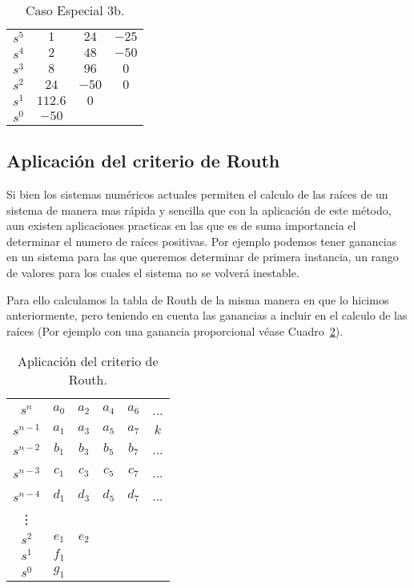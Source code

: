 \begin{enumerate}
            \begin{table}[htbp]
                \centering
                \begin{tabular}{c|c c c}
                $s^5$ & $1$ & $24$ & $-25$ \\
                $s^4$ & $2$ & $48$ & $-50$ \\
                $s^3$ & $8$ & $96$ & $0$   \\
                $s^2$ & $24$ & $-50$ & $0$ \\
                $s^1$ & $112.6$ & $0$ \\
                $s^0$ & $-50$
                \end{tabular}
                \caption{\label{tab:Caso3b}Caso Especial 3b.}
            \end{table}

        \end{enumerate}

    \subsection{Aplicación del criterio de Routh}
        Si bien los sistemas numéricos actuales permiten el calculo de las raíces de un sistema de manera mas rápida y sencilla que con la aplicación de este método, aun existen aplicaciones practicas en las que es de suma importancia el determinar el numero de raíces positivas. Por ejemplo podemos tener ganancias en un sistema para las que queremos determinar de primera instancia, un rango de valores para los cuales el sistema no se volverá inestable.

        Para ello calculamos la tabla de Routh de la misma manera en que lo hicimos anteriormente, pero teniendo en cuenta las ganancias a incluir en el calculo de las raíces (Por ejemplo con una ganancia proporcional véase Cuadro~\ref{tab:Aplicacion}).

        \begin{table}[htbp]
            \centering
            \begin{tabular}{c|c c c c c}
            $s^n$     & $a_0$ & $a_2$ & $a_4$ & $a_6$ & ...\\
            $s^{n-1}$ & $a_1$ & $a_3$ & $a_5$ & $a_7$ & $k$\\
            $s^{n-2}$ & $b_1$ & $b_3$ & $b_5$ & $b_7$ & ...\\
            $s^{n-3}$ & $c_1$ & $c_3$ & $c_5$ & $c_7$ & ...\\
            $s^{n-4}$ & $d_1$ & $d_3$ & $d_5$ & $d_7$ & ...\\
            \vdots                                         \\
            $s^2$ & $e_1$ & $e_2$                          \\
            $s^1$ & $f_1$                                  \\
            $s^0$ & $g_1$
            \end{tabular}
            \caption{\label{tab:Aplicacion}Aplicación del criterio de Routh.}
        \end{table}

